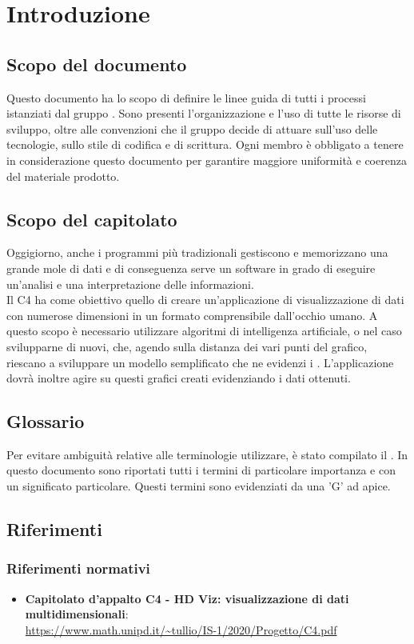 \section{Introduzione}
\subsection{Scopo del documento}
Questo documento ha lo scopo di definire le linee guida di tutti i processi istanziati dal gruppo \Gruppo{}. Sono presenti l'organizzazione e l'uso di tutte le risorse di sviluppo, oltre alle convenzioni che il gruppo decide di attuare sull'uso delle tecnologie, sullo stile di codifica e di scrittura. Ogni membro è obbligato a tenere in considerazione questo documento per garantire maggiore uniformità e coerenza del materiale prodotto.

\subsection{Scopo del capitolato}
Oggigiorno, anche i programmi più tradizionali gestiscono e memorizzano una grande mole di dati e di conseguenza serve un software in grado di eseguire un'analisi e una interpretazione delle informazioni.\\
Il  C4 ha come obiettivo quello di creare un'applicazione di visualizzazione di dati con numerose dimensioni in un formato comprensibile dall'occhio umano.  A questo scopo è necessario utilizzare algoritmi di intelligenza artificiale, o nel caso svilupparne di nuovi, che, agendo sulla distanza dei vari punti del grafico, riescano a sviluppare un modello semplificato che ne evidenzi i . 
L'applicazione dovrà inoltre agire su questi grafici creati evidenziando i dati ottenuti.

\subsection{Glossario}
Per evitare ambiguità relative alle terminologie utilizzare, è stato compilato il . In questo documento sono riportati tutti i termini di particolare importanza e con un significato particolare. Questi termini sono evidenziati da una 'G' ad apice.

\subsection{Riferimenti}
\subsubsection{Riferimenti normativi}
\begin{itemize}	
	\item \textbf{Capitolato d'appalto C4 - HD Viz: visualizzazione di dati multidimensionali}:\\
	\textcolor{blue}{\url{https://www.math.unipd.it/~tullio/IS-1/2020/Progetto/C4.pdf}}
\end{itemize}

